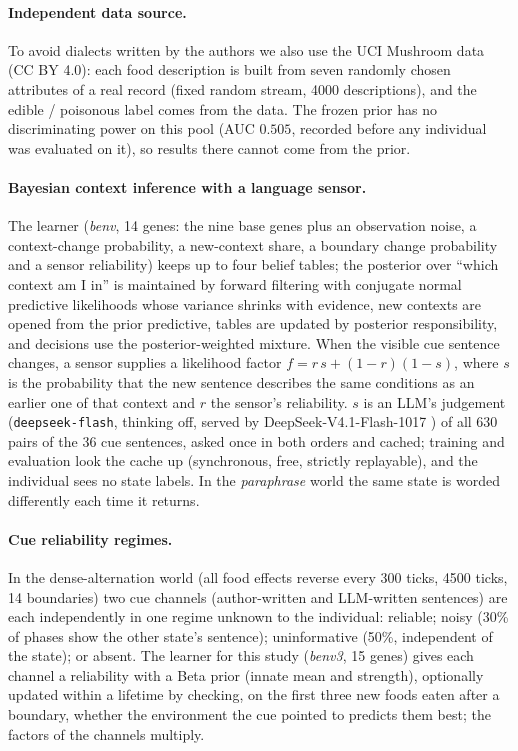 \documentclass[11pt]{article}
\begin{document}
\paragraph{Independent data source.} To avoid dialects written by the authors we also use the UCI Mushroom data \citep{uci1981mushroom} (CC BY 4.0): each food description is built from seven randomly chosen attributes of a real record (fixed random stream, 4000 descriptions), and the edible / poisonous label comes from the data. The frozen prior has no discriminating power on this pool (AUC $0.505$, recorded before any individual was evaluated on it), so results there cannot come from the prior.

\paragraph{Bayesian context inference with a language sensor.} The learner (\emph{benv}, 14 genes: the nine base genes plus an observation noise, a context-change probability, a new-context share, a boundary change probability and a sensor reliability) keeps up to four belief tables; the posterior over ``which context am I in'' is maintained by forward filtering with conjugate normal predictive likelihoods whose variance shrinks with evidence, new contexts are opened from the prior predictive, tables are updated by posterior responsibility, and decisions use the posterior-weighted mixture. When the visible cue sentence changes, a sensor supplies a likelihood factor $f=r\,s+(1-r)(1-s)$, where $s$ is the probability that the new sentence describes the same conditions as an earlier one of that context and $r$ the sensor's reliability. $s$ is an LLM's judgement (\texttt{deepseek-flash}, thinking off, served by DeepSeek-V4.1-Flash-1017 \citep{deepseek2026}) of all 630 pairs of the 36 cue sentences, asked once in both orders and cached; training and evaluation look the cache up (synchronous, free, strictly replayable), and the individual sees no state labels. In the \emph{paraphrase} world the same state is worded differently each time it returns.

\paragraph{Cue reliability regimes.} In the dense-alternation world (all food effects reverse every 300 ticks, 4500 ticks, 14 boundaries) two cue channels (author-written and LLM-written sentences) are each independently in one regime unknown to the individual: reliable; noisy (30\% of phases show the other state's sentence); uninformative (50\%, independent of the state); or absent. The learner for this study (\emph{benv3}, 15 genes) gives each channel a reliability with a Beta prior (innate mean and strength), optionally updated within a lifetime by checking, on the first three new foods eaten after a boundary, whether the environment the cue pointed to predicts them best; the factors of the channels multiply.
\end{document}
